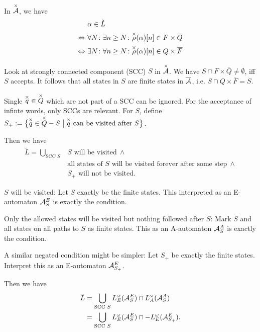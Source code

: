 
In $\overset{\times}{\mathcal{A}}$, we have
\begin{align*}
& \alpha \in \tilde L \\
\Leftrightarrow \ & \forall N \colon \exists n \ge N \colon \overset{\times}{\rho}(\alpha)[n] \in F \times \overline Q \\
\Leftrightarrow \ & \exists N \colon \forall n \ge N \colon \overset{\times}{\rho}(\alpha)[n] \in Q \times \overline F
\end{align*}

Look at strongly connected component (SCC) $S$ in $\overset{\times}{\mathcal{A}}$. We have $S \cap F \times \overline Q \neq \emptyset$, iff $S$ accepts. It follows that all states in $S$ are finite states in $\overline {\mathcal{A}}$, i.e. $S \cap Q \times \overline F = S$.

Single $\overset{\times}{q} \in \overset{\times}{Q}$ which are not part of a SCC can be ignored. For the acceptance of infinte words, only SCCs are relevant. For $S$, define $S_+ := \Set{\overx{q} \in \overx{Q}-S}{\overx{q} \text{ can be visited after } S}$.

Then we have
\begin{align*}
\tilde L = \bigcup_{\text{SCC } S} & S \text{ will be visited} \ \wedge \\
& \text{all states of } S \text{ will be visited forever after some step} \ \wedge \\
& S_+ \text{ will not be visited} .
\end{align*}

$S$ will be visited: Let $S$ exactly be the finite states. This interpreted as an E-automaton $\mathcal{A}^E_S$ is exactly the condition.

Only the allowed states will be visited but nothing followed after $S$: Mark $S$ and all states on all paths to $S$ as finite states. This as an A-automaton $\mathcal{A}^A_S$ is exactly the condition.

A similar negated condition might be simpler: Let $S_+$ be exactly the finite states. Interpret this as an E-automaton $\mathcal{A}^E_{S_+}$.

Then we have
\begin{align*}
\tilde L & = \bigcup_{\text{SCC } S} L^\omega_E (\mathcal{A}^E_S) \cap L^\omega_A (\mathcal{A}^A_S) \\
& = \bigcup_{\text{SCC } S} L^\omega_E (\mathcal{A}^E_S) \cap -L^\omega_E (\mathcal{A}^E_{S_+}) .
\end{align*}

